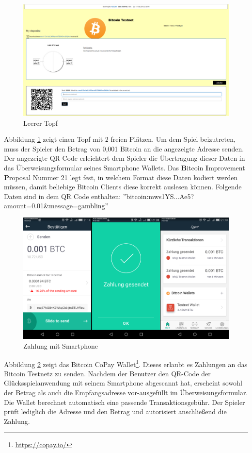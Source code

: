 \begin{figure}[H]
\centering
\includegraphics[width=1\linewidth]{Figures/btc_gui/pot_open2}
\decoRule
\caption{Leerer Topf}
\label{fig:pot_open2}
\end{figure}
Abbildung \ref{fig:pot_open2} zeigt einen Topf mit 2 freien Plätzen. Um dem Spiel beizutreten, muss der Spieler den Betrag von 0,001 Bitcoin an die angezeigte Adresse senden. Der angezeigte QR-Code erleichtert dem Spieler die Übertragung dieser Daten in das Überweisungsformular seines Smartphone Wallets. Das \textbf{B}itcoin \textbf{I}mprovement \textbf{P}roposal Nummer 21\citep{bip21} legt fest, in welchem Format diese Daten kodiert werden müssen, damit beliebige Bitcoin Clients diese korrekt auslesen können. 
Folgende Daten sind in dem QR Code enthalten: ''bitcoin:mws1YS...Ae5?amount=0.01\&message=gambling''

\begin{figure}[H]
\centering
\includegraphics[width=1\linewidth]{Figures/btc_gui/handy_send}
\decoRule
\caption{Zahlung mit Smartphone}
\label{fig:handy_send}
\end{figure}
Abbildung \ref{fig:handy_send} zeigt das Bitcoin CoPay Wallet\footnote{\url{https://copay.io/}}. Dieses erlaubt es Zahlungen an das Bitcoin Testnetz zu senden. Nachdem der Benutzer den QR-Code der Glücksspielanwendung mit seinem Smartphone abgescannt hat, erscheint sowohl der Betrag als auch die Empfangsadresse vor-ausgefüllt im Überweisungsformular. Die Wallet berechnet automatisch eine passende Transaktionsgebühr. Der Spieler prüft lediglich die Adresse und den Betrag und  autorisiert anschließend die Zahlung.

